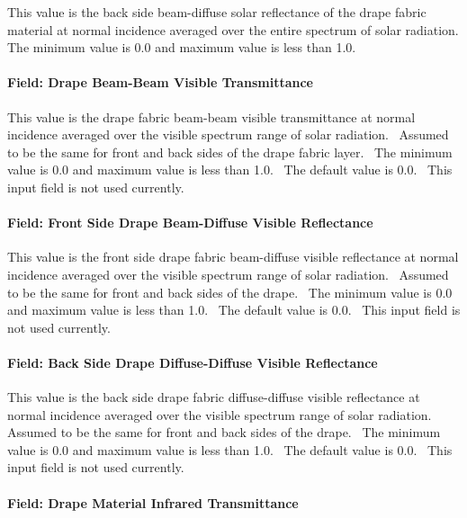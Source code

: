 This value is the back side beam-diffuse solar reflectance of the drape fabric material at normal incidence averaged over the entire spectrum of solar radiation. The minimum value is 0.0 and maximum value is less than 1.0.

\paragraph{Field: Drape Beam-Beam Visible Transmittance}\label{field-drape-beam-beam-visible-transmittance}

This value is the drape fabric beam-beam visible transmittance at normal incidence averaged over the visible spectrum range of solar radiation.~ Assumed to be the same for front and back sides of the drape fabric layer.~ The minimum value is 0.0 and maximum value is less than 1.0.~ The default value is 0.0.~ This input field is not used currently.

\paragraph{Field: Front Side Drape Beam-Diffuse Visible Reflectance}\label{field-front-side-drape-beam-diffuse-visible-reflectance}

This value is the front side drape fabric beam-diffuse visible reflectance at normal incidence averaged over the visible spectrum range of solar radiation.~ Assumed to be the same for front and back sides of the drape.~ The minimum value is 0.0 and maximum value is less than 1.0.~ The default value is 0.0.~ This input field is not used currently.

\paragraph{Field: Back Side Drape Diffuse-Diffuse Visible Reflectance}\label{field-back-side-drape-diffuse-diffuse-visible-reflectance}

This value is the back side drape fabric diffuse-diffuse visible reflectance at normal incidence averaged over the visible spectrum range of solar radiation.~ Assumed to be the same for front and back sides of the drape.~ The minimum value is 0.0 and maximum value is less than 1.0.~ The default value is 0.0.~ This input field is not used currently.

\paragraph{Field: Drape Material Infrared Transmittance}\label{field-drape-material-infrared-transmittance}

